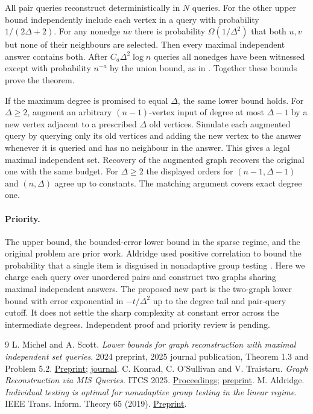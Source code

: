 \documentclass[11pt]{article}
\begin{document}
All pair queries reconstruct deterministically in $N$ queries. For the other upper bound independently include each vertex in a query with probability $1/(2\Delta+2)$. For any nonedge $uv$ there is probability $\Omega(1/\Delta^2)$ that both $u,v$ but none of their neighbours are selected. Then every maximal independent answer contains both. After $C_a\Delta^2\log n$ queries all nonedges have been witnessed except with probability $n^{-a}$ by the union bound, as in \cite{kost}. Together these bounds prove the theorem.

If the maximum degree is promised to equal $\Delta$, the same lower bound holds. For $\Delta\ge2$, augment an arbitrary $(n-1)$-vertex input of degree at most $\Delta-1$ by a new vertex adjacent to a prescribed $\Delta$ old vertices. Simulate each augmented query by querying only its old vertices and adding the new vertex to the answer whenever it is queried and has no neighbour in the answer. This gives a legal maximal independent set. Recovery of the augmented graph recovers the original one with the same budget. For $\Delta\ge2$ the displayed orders for $(n-1,\Delta-1)$ and $(n,\Delta)$ agree up to constants. The matching argument covers exact degree one.

\paragraph{Priority.} The upper bound, the bounded-error lower bound in the sparse regime, and the original problem are prior work. Aldridge used positive correlation to bound the probability that a single item is disguised in nonadaptive group testing \cite{aldridge}. Here we charge each query over unordered pairs and construct two graphs sharing maximal independent answers. The proposed new part is the two-graph lower bound with error exponential in $-t/\Delta^2$ up to the degree tail and pair-query cutoff. It does not settle the sharp complexity at constant error across the intermediate degrees. Independent proof and priority review is pending.
\begin{thebibliography}{9}
 L. Michel and A. Scott. \emph{Lower bounds for graph reconstruction with maximal independent set queries}. 2024 preprint, 2025 journal publication, Theorem 1.3 and Problem 5.2. \href{https://arxiv.org/abs/2404.03472}{Preprint}; \href{https://doi.org/10.1016/j.tcs.2025.115121}{journal}.
 C. Konrad, C. O'Sullivan and V. Traistaru. \emph{Graph Reconstruction via MIS Queries}. ITCS 2025. \href{https://doi.org/10.4230/LIPIcs.ITCS.2025.66}{Proceedings}; \href{https://arxiv.org/abs/2401.05845}{preprint}.
 M. Aldridge. \emph{Individual testing is optimal for nonadaptive group testing in the linear regime}. IEEE Trans. Inform. Theory 65 (2019). \href{https://arxiv.org/abs/1801.08590}{Preprint}.
\end{thebibliography}
\end{document}
